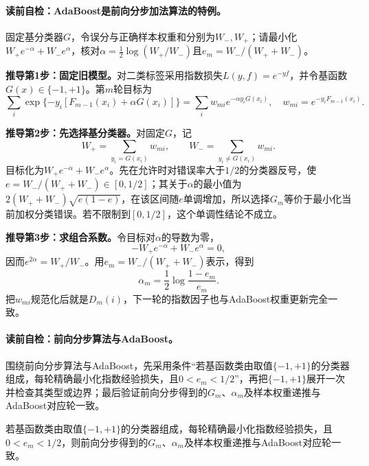 \paragraph{读前自检：AdaBoost是前向分步加法算法的特例。}固定基分类器$G$，令误分与正确样本权重和分别为$W_-,W_+$；请最小化$W_+e^{-\alpha}+W_-e^{\alpha}$，核对$\alpha=\tfrac12\log(W_+/W_-)$且$e_m=W_-/(W_++W_-)$。\par

\label{struct:V3-C03-CH17}
\textbf{推导第1步：固定旧模型。}对二类标签采用指数损失$L(y,f)=e^{-yf}$，并令基函数$G(x)\in\{-1,+1\}$。第$m$轮目标为
\[
\sum_i\exp\{-y_i[F_{m-1}(x_i)+\alpha G(x_i)]\}
=\sum_iw_{mi}e^{-\alpha y_iG(x_i)},
\quad
w_{mi}=e^{-y_iF_{m-1}(x_i)}.
\]

\textbf{推导第2步：先选择基分类器。}对固定$G$，记
\[
W_+=\sum_{y_i=G(x_i)}w_{mi},\qquad
W_-=\sum_{y_i\neq G(x_i)}w_{mi}.
\]
目标化为$W_+e^{-\alpha}+W_-e^\alpha$。先在允许时对错误率大于$1/2$的分类器反号，使$e=W_-/(W_++W_-)\in[0,1/2]$；其关于$\alpha$的最小值为$2(W_++W_-)\sqrt{e(1-e)}$，在该区间随$e$单调增加，所以选择$G_m$等价于最小化当前加权分类错误。若不限制到$[0,1/2]$，这个单调性结论不成立。

\textbf{推导第3步：求组合系数。}令目标对$\alpha$的导数为零，
\[
-W_+e^{-\alpha}+W_-e^\alpha=0,
\]
因而$e^{2\alpha}=W_+/W_-$。用$e_m=W_-/(W_++W_-)$表示，得到
\[
\alpha_m=\frac12\log\frac{1-e_m}{e_m}.
\]
把$w_{mi}$规范化后就是$D_m(i)$，下一轮的指数因子也与AdaBoost权重更新完全一致。

\paragraph{读前自检：前向分步算法与AdaBoost。}围绕前向分步算法与AdaBoost，先采用条件“若基函数类由取值$\{-1,+1\}$的分类器组成，每轮精确最小化指数经验损失，且$0<e_m<1/2$”，再把$\{-1,+1\}$展开一次并检查其类型或边界；最后验证前向分步得到的$G_m$、$\alpha_m$及样本权重递推与AdaBoost对应轮一致。\par

\label{struct:V3-C03-CH18}
\begin{theorem}[指数损失前向分步与AdaBoost的等价性]\label{thm:V3-C03-forward-equivalence}
若基函数类由取值$\{-1,+1\}$的分类器组成，每轮精确最小化指数经验损失，且$0<e_m<1/2$，则前向分步得到的$G_m$、$\alpha_m$及样本权重递推与AdaBoost对应轮一致。
\end{theorem}
